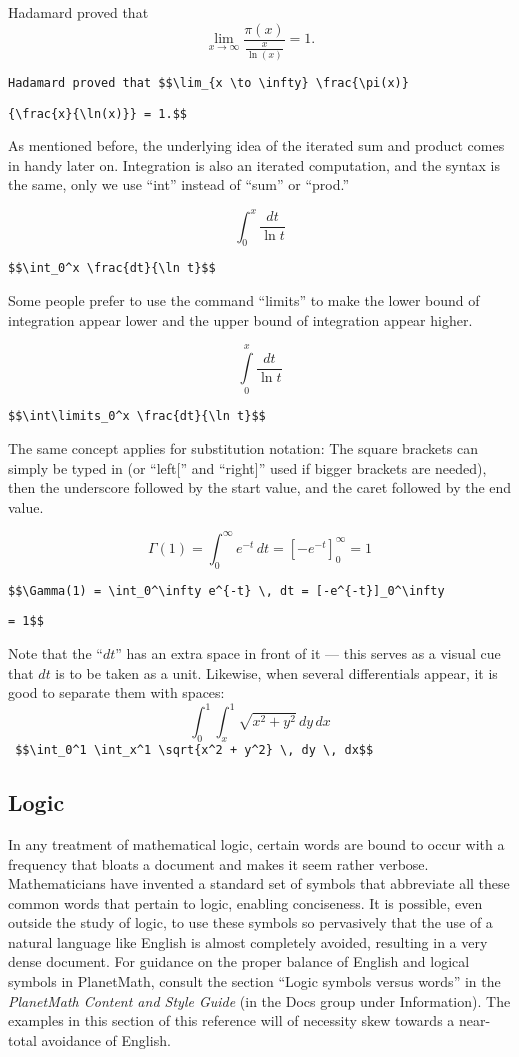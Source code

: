 Hadamard proved that $$\lim_{x \to \infty} \frac{\pi(x)}{\frac{x}{\ln(x)}} = 1.$$

\verb'Hadamard proved that $$\lim_{x \to \infty} \frac{\pi(x)}'

\verb'{\frac{x}{\ln(x)}} = 1.$$'

As mentioned before, the underlying idea of the iterated sum and product comes in handy later on. Integration is also an iterated computation, and the syntax is the same, only we use ``int'' instead of ``sum'' or ``prod.''

$$\int_0^x \frac{dt}{\ln t}$$

\verb'$$\int_0^x \frac{dt}{\ln t}$$'

Some people prefer to use the command ``limits'' to make the lower bound of integration appear lower and the upper bound of integration appear higher.

$$\int\limits_0^x \frac{dt}{\ln t}$$

\verb'$$\int\limits_0^x \frac{dt}{\ln t}$$'

The same concept applies for substitution notation: The square brackets can simply be typed in (or ``left['' and ``right]'' used if bigger brackets are needed), then the underscore followed by the start value, and the caret followed by the end value.

$$\Gamma(1) = \int_0^\infty e^{-t} \,dt = [-e^{-t}]_0^\infty = 1$$

\verb'$$\Gamma(1) = \int_0^\infty e^{-t} \, dt = [-e^{-t}]_0^\infty'

\verb'= 1$$'

Note that the ``$dt$'' has an extra space in front of it --- this serves as
a visual cue that $dt$ is to be taken as a unit. Likewise, when several
differentials appear, it is good to separate them with spaces:
$$\int_0^1 \int_x^1 \sqrt{x^2 + y^2} \, dy \, dx$$
\verb' $$\int_0^1 \int_x^1 \sqrt{x^2 + y^2} \, dy \, dx$$'

\subsection*{Logic}

In any treatment of mathematical logic, certain words are bound to occur with a frequency that bloats a document and makes it seem rather verbose. Mathematicians have invented a standard set of symbols that abbreviate all these common words that pertain to logic, enabling conciseness. It is possible, even outside the study of logic, to use these symbols so pervasively that the use of a natural language like English is almost completely avoided, resulting in a very dense document. For guidance on the proper balance of English and logical symbols in PlanetMath, consult the section ``Logic symbols versus words'' in the {\it PlanetMath Content and Style Guide} (in the Docs group under Information). The examples in this section of this reference will of necessity skew towards a near-total avoidance of English.

